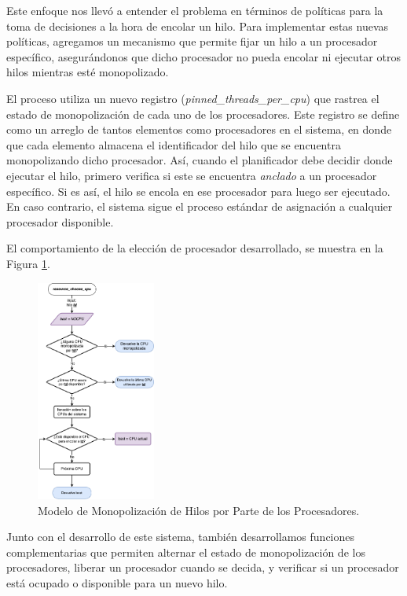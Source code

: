 Este enfoque nos llevó a entender el problema en términos de políticas para la toma de decisiones a la hora de encolar un hilo. Para implementar estas nuevas políticas, agregamos un mecanismo que permite fijar un hilo a un procesador específico, asegurándonos que dicho procesador no pueda encolar ni ejecutar otros hilos mientras esté monopolizado.

El proceso utiliza un nuevo registro (\textit{pinned\_threads\_per\_cpu}) que rastrea el estado de monopolización de cada uno de los procesadores. Este registro se define como un arreglo de tantos elementos como procesadores en el sistema, en donde que cada elemento almacena el identificador del hilo que se encuentra monopolizando dicho procesador. Así, cuando el planificador debe decidir donde ejecutar el hilo, primero verifica si este se encuentra \textit{anclado} a un procesador específico. Si es así, el hilo se encola en ese procesador para luego ser ejecutado. En caso contrario, el sistema sigue el proceso estándar de asignación a cualquier procesador disponible.

El comportamiento de la elección de procesador desarrollado, se muestra en la Figura \ref{fig:monopolization_resource-choose-cpu}.

\vspace{.50cm}
\begin{figure}[H]
    \centering
    \includegraphics[width=0.35\textwidth]{images/monopolized_choose-cpu.png}
    \caption{Modelo de Monopolización de Hilos por Parte de los Procesadores.}
    \label{fig:monopolization_resource-choose-cpu}
\end{figure}

Junto con el desarrollo de este sistema, también desarrollamos funciones complementarias que permiten alternar el estado de monopolización de los procesadores, liberar un procesador cuando se decida, y verificar si un procesador está ocupado o disponible para un nuevo hilo.

